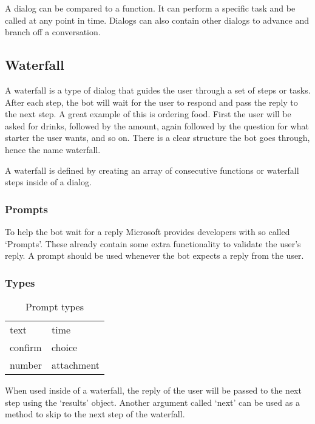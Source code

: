A dialog can be compared to a function. It can perform a specific task and be called at any point in time. Dialogs can also contain other dialogs to advance and branch off a conversation.

\subsection{Waterfall}

A waterfall is a type of dialog that guides the user through a set of steps or tasks. After each step, the bot will wait for the user to respond and pass the reply to the next step. A great example of this is ordering food. First the user will be asked for drinks, followed by the amount, again followed by the question for what starter the user wants, and so on. There is a clear structure the bot goes through, hence the name waterfall.

A waterfall is defined by creating an array of consecutive functions or waterfall steps inside of a dialog.

\subsubsection{Prompts}

To help the bot wait for a reply Microsoft provides developers with so called `Prompts'. These already contain some extra functionality to validate the user's reply. A prompt should be used whenever the bot expects a reply from the user.

\subsubsection{Types}

\renewcommand{\arraystretch}{1}
\begin{table}[h]
	\centering
	\begin{tabular}{|l|l|}
		\hline
		text & time \\
		confirm & choice \\
		number & attachment \\
		\hline
	\end{tabular}
	\caption{Prompt types}
	\label{tab:prompt-types}
\end{table}

When used inside of a waterfall, the reply of the user will be passed to the next step using the `results' object. Another argument called `next' can be used as a method to skip to the next step of the waterfall.

